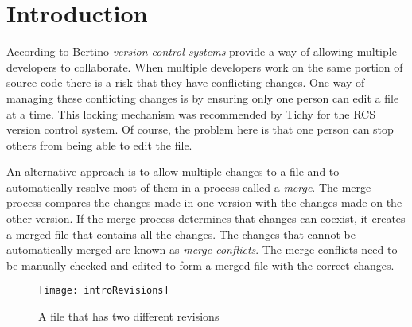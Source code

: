
\chapter{Introduction}\label{C:intro}

According to Bertino \cite{Bertino2012} \emph{version control systems} provide a way of allowing multiple developers to collaborate. 
When multiple developers work on the same portion of source code there is a risk that they have conflicting changes.  
One way of managing these conflicting changes is by ensuring only one person can edit a file at a time. 
This locking mechanism was recommended by Tichy \cite{Tichy1982} for the RCS version control system. 
Of course, the problem here is that one person can stop others from being able to edit the file. 

An alternative approach is to allow multiple changes to a file and to automatically resolve most of them in a process called a \emph{merge}.  
The merge process compares the changes made in one version with the changes made on the other version. 
If the merge process determines that changes can coexist, it creates a merged file that contains all the changes. 
The changes that cannot be automatically merged are known as \emph{merge conflicts}.  
The merge conflicts need to be manually checked and edited to form a merged file with the correct changes.

\begin{figure}[!t]
 \begin{center}
 \texttt{[image: introRevisions]}
 \end{center}
 \caption{A file that has two different revisions}
 \label{fig:introRevisions}
\end{figure}

